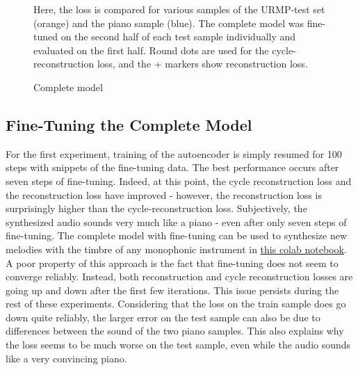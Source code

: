\begin{figure}
\begin{minipage}[b]{0.45\textwidth}
        \caption{Complete model}
        \small{Here, the loss is compared for various samples of the URMP-test set (orange) and the piano sample (blue). The complete model was fine-tuned on the second half of each test sample individually and evaluated on the first half. Round dots are used for the cycle-reconstruction loss, and the + markers show reconstruction loss.}
    \end{minipage}
    
    
   
\end{figure}

\subsection{Fine-Tuning the Complete Model}
\label{sec:complete-model}
For the first experiment, training of the autoencoder is simply resumed for 100 steps with snippets of the fine-tuning data. The best performance occurs after seven steps of fine-tuning. Indeed, at this point, the cycle reconstruction loss and the reconstruction loss have improved - however, the reconstruction loss is surprisingly higher than the cycle-reconstruction loss.
Subjectively, the synthesized audio sounds very much like a piano - even after only seven steps of fine-tuning. The complete model with fine-tuning can be used to synthesize new melodies with the timbre of any monophonic instrument in \href{https://colab.research.google.com/github/nielsrolf/ddsp/blob/master/ddsp/colab/experiments/inference.ipynb}{this colab notebook}. \newline
A poor property of this approach is the fact that fine-tuning does not seem to converge reliably. Instead, both reconstruction and cycle reconstruction losses are going up and down after the first few iterations. This issue persists during the rest of these experiments. \newline
Considering that the loss on the train sample does go down quite reliably, the larger error on the test sample can also be due to differences between the sound of the two piano samples. This also explains why the loss seems to be much worse on the test sample, even while the audio sounds like a very convincing piano.


